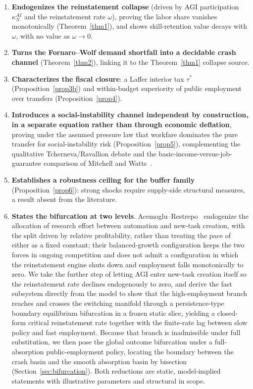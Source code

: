 \documentclass[review,12pt]{elsarticle}
\theoremstyle{plain}
\theoremstyle{definition}
\theoremstyle{remark}
\begin{document}
\begin{enumerate}
\item \textbf{Endogenizes the reinstatement collapse} (driven by AGI participation $\kappa_N^{AI}$ and the reinstatement rate $\omega$), proving the labor share vanishes monotonically (Theorem~\ref{thm1}), and shows skill-retention value decays with $\omega$, with no value as $\omega\to0$.
\item \textbf{Turns the Fornaro--Wolf demand shortfall into a decidable crash channel} (Theorem~\ref{thm2}), linking it to the Theorem~\ref{thm1} collapse source.
\item \textbf{Characterizes the fiscal closure}: a Laffer interior tax $\tau^*$ (Proposition~\ref{prop3b}) and within-budget superiority of public employment over transfers (Proposition~\ref{prop4}).
\item \textbf{Introduces a social-instability channel independent by construction, in a separate equation rather than through economic deflation}, proving under the assumed pressure law that workfare dominates the pure transfer for social-instability risk (Proposition~\ref{prop5}), complementing the qualitative Tcherneva/Ravallion debate and the basic-income-versus-job-guarantee comparison of Mitchell and Watts~\cite{Tcherneva,Ravallion,MitchellWatts2004}.
\item \textbf{Establishes a robustness ceiling for the buffer family} (Proposition~\ref{prop6}): strong shocks require supply-side structural measures, a result absent from the literature.
\item \textbf{States the bifurcation at two levels}. Acemoglu--Restrepo~\cite{AR2018} endogenize the allocation of research effort between automation and new-task creation, with the split driven by relative profitability, rather than treating the pace of either as a fixed constant; their balanced-growth configuration keeps the two forces in ongoing competition and does not admit a configuration in which the reinstatement engine shuts down and employment falls monotonically to zero. We take the further step of letting AGI enter new-task creation itself so the reinstatement rate declines endogenously to zero, and derive the fast subsystem directly from the model to show that the high-employment branch reaches and crosses the switching manifold through a persistence-type boundary equilibrium bifurcation in a frozen static slice, yielding a closed-form critical reinstatement rate together with the finite-rate lag between slow policy and fast employment. Because that branch is inadmissible under full substitution, we then pose the global outcome bifurcation under a full-absorption public-employment policy, locating the boundary between the crash basin and the smooth absorption basin by bisection (Section~\ref{sec:bifurcation}). Both reductions are static, model-implied statements with illustrative parameters and structural in scope.
\end{enumerate}
\end{document}
